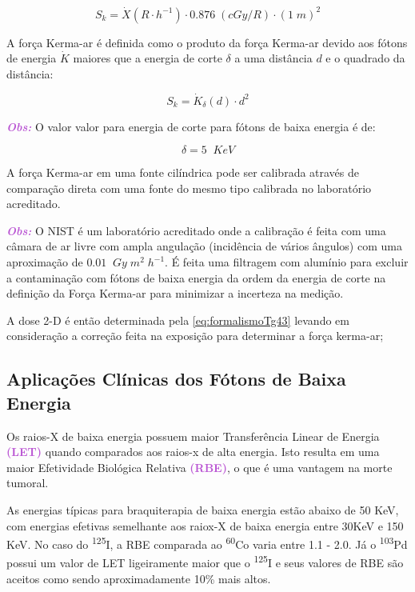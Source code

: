 \documentclass[11pt,a4paper]{article}
\begin{document}
				\begin{equation}
					S_k = \dot{X}(R \cdot h^{-1}) \cdot 0.876 \; (cGy/R) \cdot (1 \; m)^2
				\end{equation}
			
			A força Kerma-ar é definida como o produto da força Kerma-ar devido aos fótons de energia $\dot{K}$ maiores que a energia de corte $\delta$ a uma distância $d$ e o quadrado da distância:

				\begin{equation}
					S_k = \dot{K}_\delta (d) \cdot d^2
				\end{equation}

				\textit{\textbf{\textcolor{MediumOrchid}{Obs:}}} O valor valor para energia de corte para fótons de baixa energia é de:

				$$\delta = 5 \; \; KeV$$
				
			A força Kerma-ar em uma fonte cilíndrica pode ser calibrada através de comparação direta com uma fonte do mesmo tipo calibrada no laboratório acreditado.

			\textit{\textbf{\textcolor{MediumOrchid}{Obs:}}} O NIST é um laboratório acreditado onde a calibração é feita com uma câmara de ar livre com ampla angulação (incidência de vários ângulos) com uma aproximação de $0.01 \; \; Gy \; m^2 \; h^{-1}$. É feita uma filtragem com alumínio para excluir a contaminação com fótons de baixa energia da ordem da energia de corte na definição da Força Kerma-ar para minimizar a incerteza na medição.

			A dose 2-D é então determinada pela   \ref{eq:formalismoTg43} levando em consideração a correção feita na exposição para determinar a força kerma-ar;

		\subsection*{Aplicações Clínicas dos Fótons de Baixa Energia}

			Os raios-X de baixa energia possuem maior Transferência Linear de Energia \textbf{\textcolor{MediumOrchid}{(LET)}} quando comparados aos raios-x de alta energia. Isto resulta em uma maior Efetividade Biológica Relativa \textbf{\textcolor{MediumOrchid}{(RBE)}}, o que é uma vantagem na morte tumoral.

			As energias típicas para braquiterapia de baixa energia estão abaixo de 50 KeV, com energias efetivas semelhante aos raiox-X de baixa energia entre 30KeV e 150 KeV. No caso do \textsuperscript{125}I, a RBE comparada ao \textsuperscript{60}Co varia entre 1.1 - 2.0. Já o \textsuperscript{103}Pd possui um valor de LET ligeiramente maior que o \textsuperscript{125}I e seus valores de RBE são aceitos como sendo aproximadamente 10\% mais altos.
\end{document}
